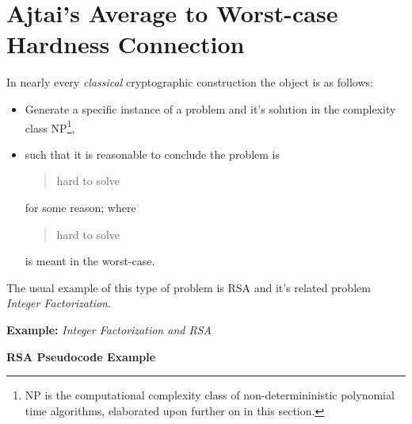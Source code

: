 \section{Ajtai's Average to Worst-case Hardness Connection}




In nearly every \emph{classical} cryptographic construction the object is as follows:
\newline
\begin{itemize}
	\item Generate a specific instance of a problem and it's solution in the complexity class NP\footnote{NP is the computational complexity class of non-determininistic polynomial time algorithms, elaborated upon further on in this section.},
	\item such that it is reasonable to conclude the problem is \begin{quotation} hard to solve \end{quotation} for some reason; where \begin{quotation} hard to solve \end{quotation} is meant in the worst-case.
\end{itemize}
The usual example of this type of problem is RSA and it's related problem \emph{Integer Factorization}. 

\medskip
{}

\bigskip
\textbf{Example:} \emph{Integer Factorization and RSA}
\newline

\newline
{}
\textbf{RSA Pseudocode Example}
\bigskip

